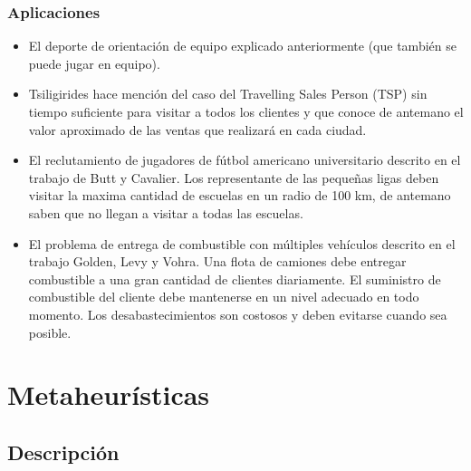 \documentclass{beamer}
\begin{document}
\begin{frame}
\frametitle{Aplicaciones}

\begin{itemize}
	\item El deporte de orientación de equipo explicado anteriormente (que también se puede jugar en equipo).
	\pause
	\item Tsiligirides hace mención del caso del Travelling Sales Person (TSP) sin tiempo suficiente para visitar a todos los clientes y que conoce de antemano el valor aproximado de las ventas que realizará en cada ciudad.
	\pause
	\item El reclutamiento de jugadores de fútbol americano universitario descrito en el trabajo de Butt y Cavalier. Los representante de las pequeñas ligas deben visitar la maxima cantidad de escuelas en un radio de 100 km, de antemano saben que no llegan a visitar a todas las escuelas.
	\pause
	\item El problema de entrega de combustible con múltiples vehículos descrito en el trabajo Golden, Levy y Vohra. Una flota de camiones debe entregar combustible a una gran cantidad de clientes diariamente. El suministro de combustible del cliente debe mantenerse en un nivel adecuado en todo momento. Los desabastecimientos son costosos y deben evitarse cuando sea posible.
\end{itemize}

\end{frame}


\section{Metaheurísticas}
\subsection{Descripción}
\end{document}
